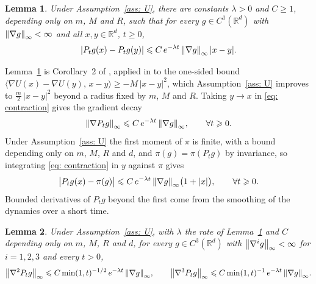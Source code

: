\documentclass[namedate,webpdf,imanum]{ima-authoring-template}
\newcommand{\Le}{\leqslant}
\newcommand{\Ge}{\geqslant}
\theoremstyle{thmstyletwo}
\newtheorem{lemma}{Lemma}
\numberwithin{equation}{section}
\begin{document}
\begin{lemma}
\label{lem: contraction}
    Under Assumption~\ref{ass: U}, there are constants $\lambda > 0$ and $C \Ge 1$, depending only on $m$, $M$ and $R$, such that for every $g \in C^1(\mathbb R^d)$ with $\norm{\nabla g}_\infty < \infty$ and all $x, y \in \mathbb R^d$, $t \Ge 0$,
    \begin{equation}
        |P_t g(x) - P_t g(y)| \Le C\, e^{-\lambda t}\, \norm{\nabla g}_\infty\, |x - y| .
        \label{eq: contraction}
    \end{equation}
\end{lemma}

Lemma~\ref{lem: contraction} is Corollary~2 of \citet{eberle2016reflection}, applied in \citet{ye2026mse} to the one-sided bound $\langle \nabla U(x) - \nabla U(y),\, x - y \rangle \Ge -M\, |x-y|^2$, which Assumption~\ref{ass: U} improves to $\frac m2\, |x-y|^2$ beyond a radius fixed by $m$, $M$ and $R$. Taking $y \to x$ in \eqref{eq: contraction} gives the gradient decay
\begin{equation}
    \norm{\nabla P_t g}_\infty \Le C\, e^{-\lambda t}\, \norm{\nabla g}_\infty , \qquad \forall t \Ge 0 .
    \label{eq: grad decay}
\end{equation}
Under Assumption~\ref{ass: U} the first moment of $\pi$ is finite, with a bound depending only on $m$, $M$, $R$ and $d$, and $\pi(g) = \pi(P_t g)$ by invariance, so integrating \eqref{eq: contraction} in $y$ against $\pi$ gives
\begin{equation}
    \bigl| P_t g(x) - \pi(g) \bigr| \Le C\, e^{-\lambda t}\, \norm{\nabla g}_\infty \bigl( 1 + |x| \bigr) , \qquad \forall t \Ge 0 .
    \label{eq: pi decay}
\end{equation}
Bounded derivatives of $P_t g$ beyond the first come from the smoothing of the dynamics over a short time.

\begin{lemma}
\label{lem: smoothing}
    Under Assumption~\ref{ass: U}, with $\lambda$ the rate of Lemma~\ref{lem: contraction} and $C$ depending only on $m$, $M$, $R$ and $d$, for every $g \in C^3(\mathbb R^d)$ with $\norm{\nabla^i g}_\infty < \infty$ for $i = 1, 2, 3$ and every $t > 0$,
    \begin{equation}
        \norm{\nabla^2 P_t g}_\infty \Le C \min(1,t)^{-1/2}\, e^{-\lambda t}\, \norm{\nabla g}_\infty , \qquad
        \norm{\nabla^3 P_t g}_\infty \Le C \min(1,t)^{-1}\, e^{-\lambda t}\, \norm{\nabla g}_\infty .
        \label{eq: smoothing}
    \end{equation}
\end{lemma}
\end{document}
